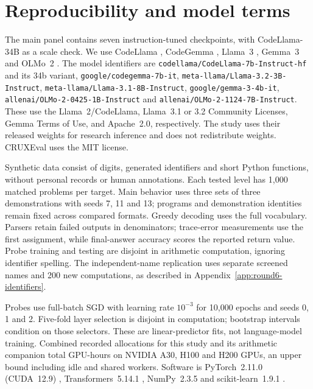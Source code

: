 \section{Reproducibility and model terms}
\label{app:reproducibility}

The main panel contains seven instruction-tuned checkpoints, with CodeLlama-34B as a
scale check. We use CodeLlama \citep{roziere2023codellama}, CodeGemma
\citep{codegemmateam2024codegemma}, Llama~3 \citep{grattafiori2024llama3}, Gemma~3
\citep{gemmateam2025gemma3} and OLMo~2 \citep{olmo2024olmo2,walsh2025olmo2}.
The model identifiers are \texttt{codellama/CodeLlama-7b-Instruct-hf} and its 34b variant,
\texttt{google/codegemma-7b-it}, \texttt{meta-llama/Llama-3.2-3B-Instruct},
\texttt{meta-llama/Llama-3.1-8B-Instruct}, \texttt{google/gemma-3-4b-it},
\texttt{allenai/OLMo-2-0425-1B-Instruct} and \texttt{allenai/OLMo-2-1124-7B-Instruct}.
These use the Llama~2/CodeLlama, Llama~3.1 or 3.2 Community Licenses, Gemma Terms of Use,
and Apache~2.0, respectively. The study uses their released weights for research inference
and does not redistribute weights. CRUXEval uses the MIT license.

Synthetic data consist of digits, generated identifiers and short Python functions,
without personal records or human annotations. Each tested level has 1,000 matched
problems per target. Main behavior uses three sets of three demonstrations with seeds
7, 11 and 13; programs and demonstration identities remain fixed across compared formats.
Greedy decoding uses the full vocabulary. Parsers retain failed outputs in denominators;
trace-error measurements use the first assignment, while final-answer accuracy scores
the reported return value. Probe training and testing are disjoint in arithmetic computation,
ignoring identifier spelling. The independent-name replication uses separate screened
names and 200 new computations, as described in Appendix~\ref{app:round6-identifiers}.

Probes use full-batch SGD with learning rate $10^{-3}$ for 10,000 epochs and seeds 0, 1 and 2.
Five-fold layer selection is disjoint in computation; bootstrap intervals condition on
those selectors. These are linear-predictor fits, not language-model training.
Combined recorded allocations for this study and its arithmetic companion total
 GPU-hours on NVIDIA A30, H100 and H200 GPUs, an upper bound
including idle and shared workers. Software is PyTorch~2.11.0 (CUDA~12.9)
\citep{paszke2019pytorch}, Transformers~5.14.1 \citep{wolf2020transformers},
NumPy~2.3.5 and scikit-learn~1.9.1 \citep{pedregosa2011sklearn}.
